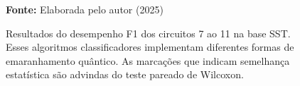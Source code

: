 \begin{figure}
\caption{Resultados do desempenho F1 dos circuitos 7 ao 11 na base \gls{SST}. Esses algoritmos classificadores implementam diferentes formas de emaranhamento quântico. As marcações que indicam semelhança estatística são advindas do teste pareado de Wilcoxon.}
\label{fig:f1:sst:g2}
     \centering
    \centering

      \par\medskip\ABNTEXfontereduzida\selectfont\textbf{Fonte:} Elaborada pelo autor (2025) \par\medskip
\end{figure}